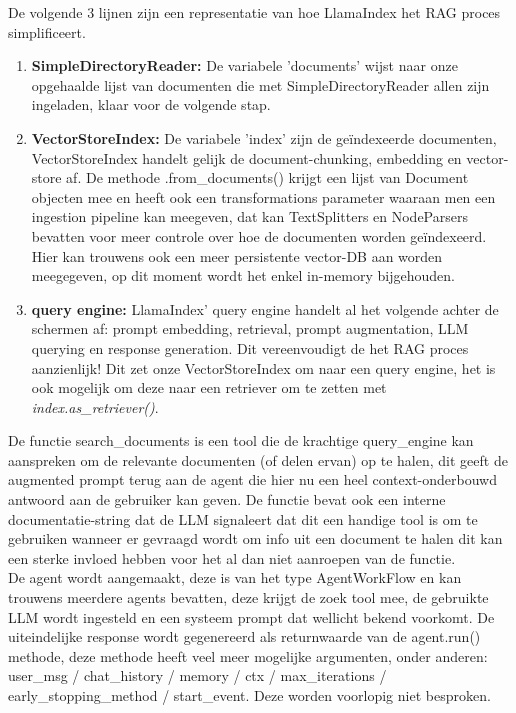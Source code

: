 De volgende 3 lijnen zijn een representatie van hoe LlamaIndex het RAG proces simplificeert. \\

\begin{enumerate}
    \item \textbf{SimpleDirectoryReader:} De variabele 'documents' wijst naar onze opgehaalde lijst van documenten die met SimpleDirectoryReader allen zijn ingeladen, klaar voor de volgende stap.
    \item \textbf{VectorStoreIndex:} De variabele 'index' zijn de geïndexeerde documenten, VectorStoreIndex handelt gelijk de document-chunking, embedding en vector-store af. De methode .from\_documents() krijgt een lijst van Document objecten mee en heeft ook een transformations parameter waaraan men een ingestion pipeline kan meegeven, dat kan TextSplitters en NodeParsers bevatten voor meer controle over hoe de documenten worden geïndexeerd. Hier kan trouwens ook een meer persistente vector-DB aan worden meegegeven, op dit moment wordt het enkel in-memory bijgehouden.
    \item \textbf{query engine:} LlamaIndex' query engine handelt al het volgende achter de schermen af: prompt embedding, retrieval, prompt augmentation, LLM querying en response generation. Dit vereenvoudigt de het RAG proces aanzienlijk! Dit zet onze VectorStoreIndex om naar een query engine, het is ook mogelijk om deze naar een retriever om te zetten met \textit{index.as\_retriever()}.
\end{enumerate}

De functie search\_documents is een tool die de krachtige query\_engine kan aanspreken om de relevante documenten (of delen ervan) op te halen, dit geeft de augmented prompt terug aan de agent die hier nu een heel context-onderbouwd antwoord aan de gebruiker kan geven. De functie bevat ook een interne documentatie-string dat de LLM signaleert dat dit een handige tool is om te gebruiken wanneer er gevraagd wordt om info uit een document te halen dit kan een sterke invloed hebben voor het al dan niet aanroepen van de functie. \\

De agent wordt aangemaakt, deze is van het type AgentWorkFlow en kan trouwens meerdere agents bevatten, deze krijgt de zoek tool mee, de gebruikte LLM wordt ingesteld en een systeem prompt dat wellicht bekend voorkomt. De uiteindelijke response wordt gegenereerd als returnwaarde van de agent.run() methode, deze methode heeft veel meer mogelijke argumenten, onder anderen: user\_msg / chat\_history / memory / ctx / max\_iterations / early\_stopping\_method / start\_event. Deze worden voorlopig niet besproken. \\

